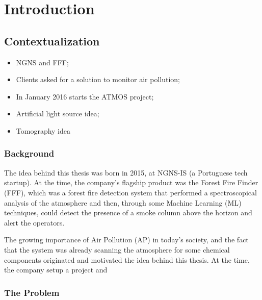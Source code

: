 \newcommand{\novathesis}{\emph{novathesis}}
\newcommand{\novathesisclass}{\texttt{novathesis.cls}}


\chapter{Introduction}
\label{cha:introduction}

\section{Contextualization}%
\label{sec:contextualisation}
\begin{itemize}
    \item NGNS and FFF;
    \item Clients asked for a solution to monitor air pollution;
    \item In January 2016 starts the ATMOS project;
    \item Artificial light source idea;
    \item Tomography idea
\end{itemize}

\subsection{Background}%
\label{sub:background}

The idea behind this thesis was born in 2015, at NGNS-IS (a Portuguese
tech startup). At the time, the company's flagship product was the
Forest Fire Finder (\gls{FFF}), which was a forest fire detection system
that performed a spectroscopical analysis of the atmosphere and then,
through some Machine Learning (\gls{ML}) techniques, could detect the
presence of a smoke column above the horizon and alert the operators.

The growing importance of Air Pollution (\gls{AP}) in today's society,
and the fact that the system was already scanning the atmosphere for
some chemical components originated and motivated the idea behind this
thesis. At the time, the company setup a project and 

\subsection{The Problem}%
\label{sub:the_problem}


